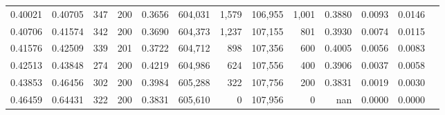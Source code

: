\begin{tabular}{rrrrrrrrrrrrr}
0.40021 & 0.40705 &   347 & 200 &                                     0.3656 & 604,031 &   1,579 & 106,955 &   1,001 & 0.3880 & 0.0093 & 0.0146 \\
0.40706 & 0.41574 &   342 & 200 &                                     0.3690 & 604,373 &   1,237 & 107,155 &     801 & 0.3930 & 0.0074 & 0.0115 \\
0.41576 & 0.42509 &   339 & 201 &                                     0.3722 & 604,712 &     898 & 107,356 &     600 & 0.4005 & 0.0056 & 0.0083 \\
0.42513 & 0.43848 &   274 & 200 &                                     0.4219 & 604,986 &     624 & 107,556 &     400 & 0.3906 & 0.0037 & 0.0058 \\
0.43853 & 0.46456 &   302 & 200 &                                     0.3984 & 605,288 &     322 & 107,756 &     200 & 0.3831 & 0.0019 & 0.0030 \\
0.46459 & 0.64431 &   322 & 200 &                                     0.3831 & 605,610 &       0 & 107,956 &       0 &    nan & 0.0000 & 0.0000 \\
\bottomrule
\end{tabular}
